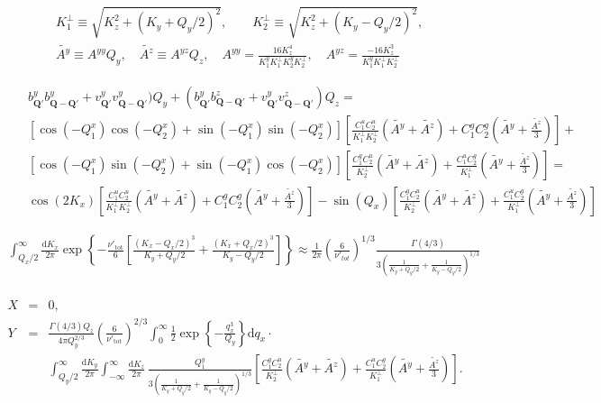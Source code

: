 \documentclass[a4paper,11pt]{article}
\begin{document}
\begin{eqnarray}
 && K_1^\perp \equiv \sqrt{K_z^2 + (K_y+Q_y/2)^2},\qquad  K_2^\perp \equiv \sqrt{K_z^2 + (K_y-Q_y/2)^2}, \\
 && \tilde{A^y} \equiv A^{yy}Q_y,\quad \tilde{A^z} \equiv A^{yz}Q_z,\quad A^{yy} = \frac{16K_z^4}{K_1^y K_1^\perp K_2^y K_2^\perp}   , \quad A^{yz} = \frac{-16K_z^3}{K_1^y K_1^\perp K_2^\perp}
\end{eqnarray}


\begin{eqnarray}
 && b_{\mathbf{Q}'}^yb_{\mathbf{Q}-\mathbf{Q}'}^y + v_{\mathbf{Q}'}^yv_{\mathbf{Q}-\mathbf{Q}'}^y)Q_y + (b_{\mathbf{Q}'}^yb_{\mathbf{Q}-\mathbf{Q}'}^z + v_{\mathbf{Q}'}^yv_{\mathbf{Q}-\mathbf{Q}'}^z)Q_z = \nonumber \\ 
 && \left[\cos(-Q_1^x)\cos(-Q_2^x) + \sin(-Q_1^x)\sin(-Q_2^x)\right]\left[\frac{C_1^u C_2^u}{K_1^\perp K_2^\perp}(\tilde{A^y} + \tilde{A^z}) + C_1^gC_2^g(\tilde{A^y} + \frac{\tilde{A^z}}3 ) \right] + \\
 && \left[\cos(-Q_1^x)\sin(-Q_2^x) + \sin(-Q_1^x)\cos(-Q_2^x)\right]\left[\frac{C_1^g C_2^u}{K_2^\perp}(\tilde{A^y} + \tilde{A^z}) + \frac{C_1^u C_2^g}{K_1^\perp}(\tilde{A^y} + \frac{\tilde{A^z}}3 ) \right] = \\
 && \cos(2K_x)\left[\frac{C_1^u C_2^u}{K_1^\perp K_2^\perp}(\tilde{A^y} + \tilde{A^z}) + C_1^gC_2^g(\tilde{A^y} + \frac{\tilde{A^z}}3 ) \right] -\sin(Q_x)\left[\frac{C_1^g C_2^u}{K_2^\perp}(\tilde{A^y} + \tilde{A^z}) + \frac{C_1^u C_2^g}{K_1^\perp}(\tilde{A^y} + \frac{\tilde{A^z}}3 ) \right]
 \end{eqnarray}


\begin{eqnarray}
  \int_{Q_x/2}^\infty \frac{\mathrm{d}K_x}{2\pi}  \exp\left\{ -\frac{\nu'_{\mathrm{tot}}}{6}\left[\frac{(K_x-Q_x/2)^3}{K_y+Q_y/2}+\frac{(K_x+Q_x/2)^3}{K_y-Q_y/2}\right]\right\} \approx \frac1{2\pi} \left( \frac{6}{\nu'_{tot}}  \right)^{1/3} \frac{\Gamma(4/3)}{3\left( \frac1{K_y + Q_y/2} + \frac1{K_y - Q_y/2} \right)^{1/3}} \nonumber \\ 
\end{eqnarray}

\begin{eqnarray*}
 X &=& 0,\nonumber \\
 Y &=& \frac{\Gamma(4/3)Q_z}{4\pi Q_y^{2/3}}\left(\frac6{\nu'_\mathrm{tot}}\right)^{2/3} \int_0^\infty \frac12 \exp\left\{-\frac{q_x^3}{Q_y} \right\} \mathrm{d}q_x \cdot \nonumber \\
 &&\int_{Q_y/2}^\infty \frac{\mathrm{d}K_y}{2\pi} \int_{-\infty}^\infty \frac{\mathrm{d}K_z}{2\pi} \, \frac{Q_1^y}{3\left( \frac1{K_y + Q_y/2} + \frac1{K_y - Q_y/2} \right)^{1/3}} 
 \left[\frac{C_1^g C_2^u}{K_2^\perp}(\tilde{A^y} + \tilde{A^z}) + \frac{C_1^u C_2^g}{K_1^\perp}(\tilde{A^y} + \frac{\tilde{A^z}}3 ) \right] .\nonumber
\end{eqnarray*}
\end{document}
